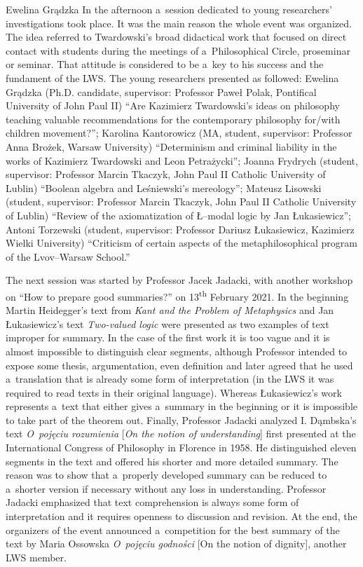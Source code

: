 \begin{editorialeng}{Ewelina Grądzka}
In the afternoon a~session dedicated to young researchers’ investigations took place. It was the main reason the whole event was organized. The idea referred to Twardowski’s broad didactical work that focused on direct contact with students during the meetings of a~Philosophical Circle, proseminar or seminar. That attitude is considered to be a~key to his success and the fundament of the LWS. The young researchers presented as followed: Ewelina Grądzka (Ph.D. candidate, supervisor: Professor Paweł Polak, Pontifical University of John Paul II) ``Are Kazimierz Twardowski’s ideas on philosophy teaching valuable recommendations for the contemporary philosophy for/with children movement?''; Karolina Kantorowicz (MA, student, supervisor: Professor Anna Brożek, Warsaw University) ``Determinism and criminal liability in the works of Kazimierz Twardowski and Leon Petrażycki''; Joanna Frydrych (student, supervisor: Professor Marcin Tkaczyk, John Paul II Catholic University of Lublin) ``Boolean algebra and Leśniewski’s mereology''; Mateusz Lisowski (student, supervisor: Professor Marcin Tkaczyk, John Paul II Catholic University of Lublin) ``Review of the axiomatization of Ł--modal logic by Jan Łukasiewicz''; Antoni Torzewski (student, supervisor: Professor Dariusz Łukasiewicz, Kazimierz Wielki University) ``Criticism of certain aspects of the metaphilosophical program of the Lvov--Warsaw School.''

The next session was started by Professor Jacek Jadacki, with another workshop on ``How to prepare good summaries?'' on 13\textsuperscript{th} February 2021. In the beginning Martin Heidegger’s text from \textit{Kant and the Problem of Metaphysics} and Jan Łukasiewicz’s text \textit{Two-valued logic} were presented as two examples of text improper for summary. In the case of the first work it is too vague and it is almost impossible to distinguish clear segments, although Professor intended to expose some thesis, argumentation, even definition and later agreed that he used a~translation that is already some form of interpretation (in the LWS it was required to read texts in their original language). Whereas Łukasiewicz’s work represents a~text that either gives a~summary in the beginning or it is impossible to take part of the theorem out. Finally, Professor Jadacki analyzed I. Dąmbska’s text \textit{O~pojęciu rozumienia} [\textit{On the notion of understanding}]
\parencite[][]{dambska_notion_2016} %
 first presented at the International Congress of Philosophy in Florence in 1958. He distinguished eleven segments in the text and offered his shorter and more detailed summary. The reason was to show that a~properly developed summary can be reduced to a~shorter version if necessary without any loss in understanding. Professor Jadacki emphasized that text comprehension is always some form of interpretation and it requires openness to discussion and revision. At the end, the organizers of the event announced a~competition for the best summary of the text by Maria Ossowska \textit{O~pojęciu godności} [On the notion of dignity], another LWS member.


\end{editorialeng}
